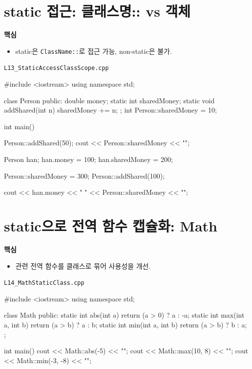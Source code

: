 \documentclass[11pt,a4paper]{article}
\newcommand{\filetag}[1]{\texttt{\color{Accent}#1}}
\begin{document}
\section{static 접근: 클래스명:: vs 객체}
\begin{GoalBox}
\textbf{핵심}
\begin{itemize}[leftmargin=18pt]
  \item static은 \texttt{ClassName::}로 접근 가능, non-static은 불가.
\end{itemize}
\end{GoalBox}

\noindent\filetag{L13\_StaticAccessClassScope.cpp}
\begin{cppcode}
#include <iostream>
using namespace std;

class Person {
public:
    double money;
    static int sharedMoney;
    static void addShared(int n) { sharedMoney += n; }
};
int Person::sharedMoney = 10;

int main() {
    Person::addShared(50);
    cout << Person::sharedMoney << "\n";

    Person han;
    han.money = 100;
    han.sharedMoney = 200;

    Person::sharedMoney = 300;
    Person::addShared(100);

    cout << han.money << " " << Person::sharedMoney << "\n";
}
\end{cppcode}

\section{static으로 전역 함수 캡슐화: Math}
\begin{GoalBox}
\textbf{핵심}
\begin{itemize}[leftmargin=18pt]
  \item 관련 전역 함수를 클래스로 묶어 사용성을 개선.
\end{itemize}
\end{GoalBox}

\noindent\filetag{L14\_MathStaticClass.cpp}
\begin{cppcode}
#include <iostream>
using namespace std;

class Math {
public:
    static int abs(int a) { return (a > 0) ? a : -a; }
    static int max(int a, int b) { return (a > b) ? a : b; }
    static int min(int a, int b) { return (a > b) ? b : a; }
};

int main() {
    cout << Math::abs(-5) << "\n";
    cout << Math::max(10, 8) << "\n";
    cout << Math::min(-3, -8) << "\n";
}
\end{cppcode}
\end{document}
